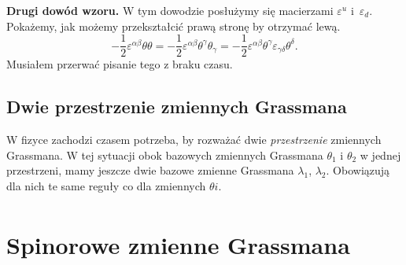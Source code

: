 \documentclass[a4paper,11pt]{article}
\begin{document}
\textbf{Drugi dowód wzoru.} W tym dowodzie posłużymy się macierzami $\varepsilon^{ u }$ i~$\varepsilon_{ d }$. Pokażemy, jak możemy przekształcić prawą stronę by otrzymać lewą.
\begin{equation}
  \label{eq:11}
  -\frac{ 1 }{ 2 } \varepsilon^{ \alpha \beta } \theta \theta
  = -\frac{ 1 }{ 2 } \varepsilon^{ \alpha \beta } \theta^{ \gamma } \theta_{ \gamma }
  = -\frac{ 1 }{ 2 } \varepsilon^{ \alpha \beta } \theta^{ \gamma } \varepsilon_{ \gamma \delta } \theta^{ \delta }.
\end{equation}
Musiałem przerwać pisanie tego z braku czasu.





\subsection{Dwie przestrzenie zmiennych Grassmana}


W fizyce zachodzi czasem potrzeba, by rozważać dwie \textit{przestrzenie} zmiennych Grassmana. W tej sytuacji obok bazowych zmiennych Grassmana $\theta_{ 1 }$ i $\theta_{ 2 }$ w jednej przestrzeni, mamy jeszcze dwie bazowe zmienne Grassmana $\lambda_{ 1 }$, $\lambda_{ 2 }$. Obowiązują dla nich te same reguły co dla zmiennych $\theta{ i }$.
\begin{subequations}
  \begin{align}

  \end{align}
\end{subequations}




\section{Spinorowe zmienne Grassmana}














{}






\end{document}
